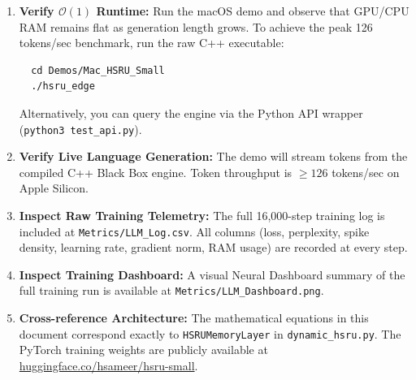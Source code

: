 \documentclass[11pt]{article}
\begin{document}
\begin{enumerate}
    \item \textbf{Verify $\mathcal{O}(1)$ Runtime:} Run the macOS demo and observe that GPU/CPU RAM remains flat as generation length grows. To achieve the peak 126 tokens/sec benchmark, run the raw C++ executable:
    \begin{verbatim}
  cd Demos/Mac_HSRU_Small
  ./hsru_edge
    \end{verbatim}
    Alternatively, you can query the engine via the Python API wrapper (\texttt{python3 test\_api.py}).
    \item \textbf{Verify Live Language Generation:} The demo will stream tokens from the compiled C++ Black Box engine. Token throughput is $\geq 126$ tokens/sec on Apple Silicon.
    \item \textbf{Inspect Raw Training Telemetry:} The full 16,000-step training log is included at \texttt{Metrics/LLM\_Log.csv}. All columns (loss, perplexity, spike density, learning rate, gradient norm, RAM usage) are recorded at every step.
    \item \textbf{Inspect Training Dashboard:} A visual Neural Dashboard summary of the full training run is available at \texttt{Metrics/LLM\_Dashboard.png}.
    \item \textbf{Cross-reference Architecture:} The mathematical equations in this document correspond exactly to \texttt{HSRUMemoryLayer} in \texttt{dynamic\_hsru.py}. The PyTorch training weights are publicly available at \href{https://huggingface.co/hsameer/hsru-small}{huggingface.co/hsameer/hsru-small}.
\end{enumerate}
\end{document}
